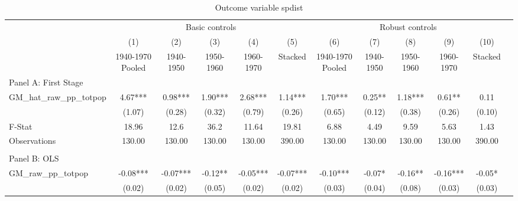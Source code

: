  \begin{table}[htbp]\centering {} \begin{threeparttable} \caption{Outcome variable spdist } \begin{tabular}{l*{11}{c}} \toprule
          &\multicolumn{5}{c}{Basic controls}                                   &\multicolumn{5}{c}{Robust controls}                                  \\\cmidrule(lr){2-6}\cmidrule(lr){7-11}
          &\multicolumn{1}{c}{(1)}&\multicolumn{1}{c}{(2)}&\multicolumn{1}{c}{(3)}&\multicolumn{1}{c}{(4)}&\multicolumn{1}{c}{(5)}&\multicolumn{1}{c}{(6)}&\multicolumn{1}{c}{(7)}&\multicolumn{1}{c}{(8)}&\multicolumn{1}{c}{(9)}&\multicolumn{1}{c}{(10)}\\
          &\multicolumn{1}{c}{1940-1970 Pooled}&\multicolumn{1}{c}{1940-1950}&\multicolumn{1}{c}{1950-1960}&\multicolumn{1}{c}{1960-1970}&\multicolumn{1}{c}{Stacked}&\multicolumn{1}{c}{1940-1970 Pooled}&\multicolumn{1}{c}{1940-1950}&\multicolumn{1}{c}{1950-1960}&\multicolumn{1}{c}{1960-1970}&\multicolumn{1}{c}{Stacked}\\
\cmidrule(lr){1-11}
\multicolumn{10}{l}{Panel A: First Stage}\\
\cmidrule(lr){1-11}
GM\_hat\_raw\_pp\_totpop&      4.67***&      0.98***&      1.90***&      2.68***&      1.14***&      1.70***&      0.25** &      1.18***&      0.61** &      0.11   \\
          &    (1.07)   &    (0.28)   &    (0.32)   &    (0.79)   &    (0.26)   &    (0.65)   &    (0.12)   &    (0.38)   &    (0.26)   &    (0.10)   \\
\midrule
F-Stat    &     18.96   &      12.6   &      36.2   &     11.64   &     19.81   &      6.88   &      4.49   &      9.59   &      5.63   &      1.43   \\
Observations&    130.00   &    130.00   &    130.00   &    130.00   &    390.00   &    130.00   &    130.00   &    130.00   &    130.00   &    390.00   \\
\cmidrule[\heavyrulewidth](lr){1-11} \\ \cmidrule[\heavyrulewidth](lr){1-11}
\multicolumn{10}{l}{Panel B: OLS}\\
\cmidrule(lr){1-11}
GM\_raw\_pp\_totpop&     -0.08***&     -0.07***&     -0.12** &     -0.05***&     -0.07***&     -0.10***&     -0.07*  &     -0.16** &     -0.16***&     -0.05*  \\
          &    (0.02)   &    (0.02)   &    (0.05)   &    (0.02)   &    (0.02)   &    (0.03)   &    (0.04)   &    (0.08)   &    (0.03)   &    (0.03)   \\

\end{tabular}
\end{threeparttable}
\end{table}
